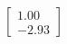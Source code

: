 \documentclass[preview]{standalone}
\begin{document}
\begin{align*}
\begin{bmatrix} 1.00 \\ -2.93 \end{bmatrix}
\end{align*}
\end{document}
